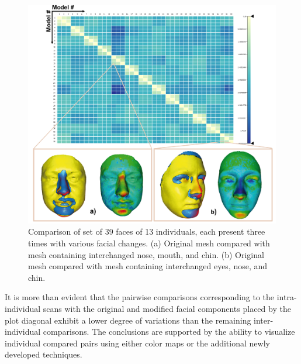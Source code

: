 \documentclass[final,5p,times]{elsarticle}
\begin{document}
\begin{figure}[htb]
	\centering
  \includegraphics[width=1\linewidth]{pictures/case2.png}
  \caption{\label{fig:case2}Comparison of set of 39 faces of 13 individuals, each present three times with various facial changes. (a) Original mesh compared with mesh containing interchanged nose, mouth, and chin. (b) Original mesh compared with mesh containing interchanged eyes, nose, and chin.}
\vspace{-3mm}
\end{figure}

It is more than evident that the pairwise comparisons corresponding to the intra-individual scans with the original and modified facial components placed by the plot diagonal exhibit a lower degree of variations than the remaining inter-individual comparisons.
The conclusions are supported by the ability to visualize individual compared pairs using either color maps or the additional newly developed techniques. 
\end{document}
